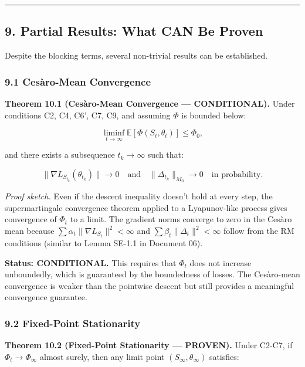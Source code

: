 \documentclass[
  12pt,
]{ctexart}
\begin{document}
\begin{center}\rule{0.5\linewidth}{0.5pt}\end{center}

\subsection{9. Partial Results: What CAN Be
Proven}\label{partial-results-what-can-be-proven}

Despite the blocking terms, several non-trivial results can be
established.

\subsubsection{9.1 Cesàro-Mean
Convergence}\label{cesuxe0ro-mean-convergence}

\textbf{Theorem 10.1 (Cesàro-Mean Convergence --- CONDITIONAL).} Under
conditions C2, C4, C6', C7, C9, and assuming \(\Phi\) is bounded below:

\[\liminf_{t \to \infty} \mathbb{E}[\Phi(S_t, \theta_t)] \leq \Phi_0,\]

and there exists a subsequence \(t_k \to \infty\) such that:

\[\|\nabla L_{S_{t_k}}(\theta_{t_k})\| \to 0 \quad \text{and} \quad \|\Delta_{t_k}\|_{M_0} \to 0 \quad \text{in probability}.\]

\emph{Proof sketch.} Even if the descent inequality doesn't hold at
every step, the supermartingale convergence theorem applied to a
Lyapunov-like process gives convergence of \(\Phi_t\) to a limit. The
gradient norms converge to zero in the Cesàro mean because
\(\sum \alpha_t \|\nabla L_{S_t}\|^2 < \infty\) and
\(\sum \beta_t \|\Delta_t\|^2 < \infty\) follow from the RM conditions
(similar to Lemma SE-1.1 in Document 06).

\textbf{Status: CONDITIONAL.} This requires that \(\Phi_t\) does not
increase unboundedly, which is guaranteed by the boundedness of losses.
The Cesàro-mean convergence is weaker than the pointwise descent but
still provides a meaningful convergence guarantee.

\subsubsection{9.2 Fixed-Point
Stationarity}\label{fixed-point-stationarity}

\textbf{Theorem 10.2 (Fixed-Point Stationarity --- PROVEN).} Under
C2-C7, if \(\Phi_t \to \Phi_\infty\) almost surely, then any limit point
\((S_\infty, \theta_\infty)\) satisfies:
\end{document}
